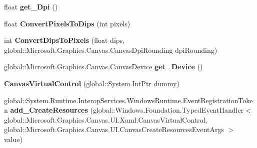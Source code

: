 \begin{DoxyCompactItemize}
float {\bfseries get\+\_\+\+Dpi} ()
\item 
\mbox{\label{class_microsoft_1_1_graphics_1_1_canvas_1_1_u_i_1_1_xaml_1_1_canvas_virtual_control_ad9fa8ad680693ecd08e5d86a065f7784}} 
float {\bfseries Convert\+Pixels\+To\+Dips} (int pixels)
\item 
\mbox{\label{class_microsoft_1_1_graphics_1_1_canvas_1_1_u_i_1_1_xaml_1_1_canvas_virtual_control_a03057031bb915e5c65afa64e5dcd1474}} 
int {\bfseries Convert\+Dips\+To\+Pixels} (float dips, global\+::\+Microsoft.\+Graphics.\+Canvas.\+Canvas\+Dpi\+Rounding dpi\+Rounding)
\item 
\mbox{\label{class_microsoft_1_1_graphics_1_1_canvas_1_1_u_i_1_1_xaml_1_1_canvas_virtual_control_a81a72cc0fa39cc066e7b2ebe1c69c058}} 
global\+::\+Microsoft.\+Graphics.\+Canvas.\+Canvas\+Device {\bfseries get\+\_\+\+Device} ()
\item 
\mbox{\label{class_microsoft_1_1_graphics_1_1_canvas_1_1_u_i_1_1_xaml_1_1_canvas_virtual_control_a09dd36cea5da7f54fbb16a91d4df4e72}} 
{\bfseries Canvas\+Virtual\+Control} (global\+::\+System.\+Int\+Ptr dummy)
\item 
\mbox{\label{class_microsoft_1_1_graphics_1_1_canvas_1_1_u_i_1_1_xaml_1_1_canvas_virtual_control_a4223ddace384a3165f478a4d7db7b73a}} 
global\+::\+System.\+Runtime.\+Interop\+Services.\+Windows\+Runtime.\+Event\+Registration\+Token {\bfseries add\+\_\+\+Create\+Resources} (global\+::\+Windows.\+Foundation.\+Typed\+Event\+Handler$<$ global\+::\+Microsoft.\+Graphics.\+Canvas.\+U\+I.\+Xaml.\+Canvas\+Virtual\+Control, global\+::\+Microsoft.\+Graphics.\+Canvas.\+U\+I.\+Canvas\+Create\+Resources\+Event\+Args $>$ value)
\item 
\mbox{\label{class_microsoft_1_1_graphics_1_1_canvas_1_1_u_i_1_1_xaml_1_1_canvas_virtual_control_a12628d4980246897d39f0971c3287ca0}} 

\end{DoxyCompactItemize}
